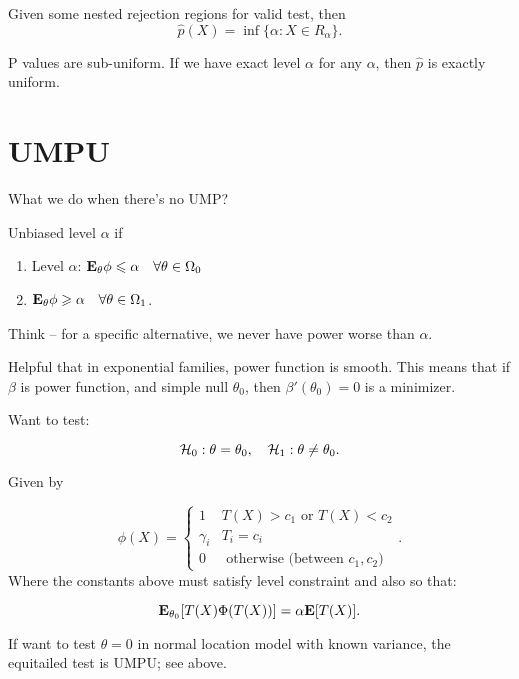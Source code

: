 \documentclass{article}
\begin{document}
\begin{definition}[p-value]
Given some nested rejection regions for valid test, then
$$\hat p(X)= \inf \{\alpha: X\in R_\alpha\}.$$
\end{definition}
\begin{fact}
P values are sub-uniform. If we have exact level $\alpha$ for any $\alpha$, then $\hat p$ is exactly uniform.
\end{fact}


\section{UMPU}
What we do when there's no UMP? 
\begin{definition}
Unbiased level $\alpha$ if 
\begin{enumerate}
	\item Level $\alpha$: $\mathbf{E}_\theta \phi \leqslant \alpha \quad \forall \theta\in \Omega_0$
	\item $\mathbf{E}_\theta \phi \geqslant \alpha \quad \forall \theta \in \Omega_1$.
\end{enumerate}
Think -- for a specific alternative, we never have power worse than $\alpha$.
\end{definition}

Helpful that in exponential families, power function is smooth. This means that if $\beta$ is power function, and simple null $\theta_0$, then $\beta '(\theta_0) = 0$ is a minimizer.

\begin{theorem}
Want to test:

$$\mathcal H_0: \theta= \theta_0, \quad \mathcal H_1: \theta \neq \theta_0.$$

Given by 

$$\phi(X) = \begin{cases}
	1 & T(X) >c_1 \text{ or } T(X) <c_2\\
	\gamma_i & T_i = c_i\\
	0 &\text{ otherwise (between $c_1, c_2$)}
\end{cases}.$$
Where the constants above must satisfy level constraint and also so that:

$$\mathbf{E}_{\theta_0}[T(X) \Phi(T(X)) ] = \alpha \mathbf{E} [T(X)].$$

\end{theorem}
\begin{example}
If want to test $\theta = 0$ in normal location model with known variance, the equitailed test is UMPU; see above.
\end{example}
\end{document}

